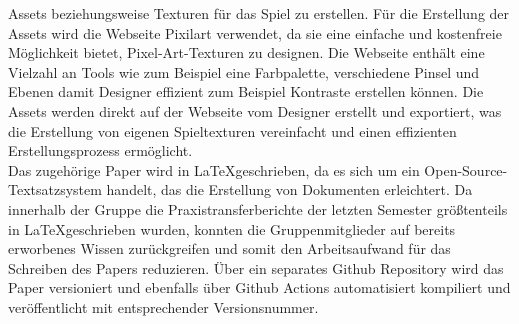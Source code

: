 Assets beziehungsweise Texturen für das Spiel zu erstellen.
Für die Erstellung der Assets wird die Webseite Pixilart verwendet, da sie eine einfache und kostenfreie Möglichkeit
bietet, Pixel-Art-Texturen zu designen.
Die Webseite enthält eine Vielzahl an Tools wie zum Beispiel eine Farbpalette, verschiedene
Pinsel und Ebenen damit Designer effizient zum Beispiel Kontraste erstellen können.
Die Assets werden direkt auf der Webseite vom Designer erstellt und exportiert, was die Erstellung von eigenen
Spieltexturen vereinfacht und einen effizienten Erstellungsprozess ermöglicht.\\
\newline
Das zugehörige Paper wird in \LaTeX{}geschrieben, da es sich um ein Open-Source-Textsatzsystem handelt, das die
Erstellung von Dokumenten erleichtert.
Da innerhalb der Gruppe die Praxistransferberichte der letzten Semester größtenteils in \LaTeX{}geschrieben wurden,
konnten die Gruppenmitglieder auf bereits erworbenes Wissen zurückgreifen und somit den Arbeitsaufwand für das Schreiben
des Papers reduzieren.
Über ein separates Github Repository wird das Paper versioniert und ebenfalls über Github Actions automatisiert 
kompiliert und veröffentlicht mit entsprechender Versionsnummer.